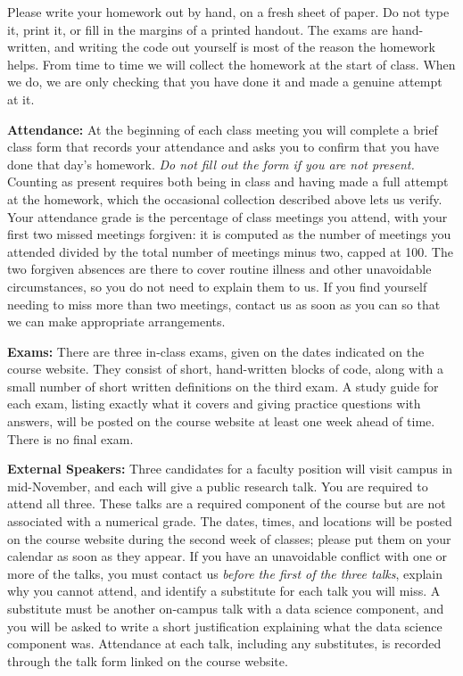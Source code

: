 \documentclass[11pt, a4paper]{article}
\begin{document}
\medskip

Please write your homework out by hand, on a fresh sheet of paper. Do not type it, print it, or fill in the margins of a printed handout. The exams are hand-written, and writing the code out yourself is most of the reason the homework helps. From time to time we will collect the homework at the start of class. When we do, we are only checking that you have done it and made a genuine attempt at it. 

\bigskip

\textbf{Attendance:}
At the beginning of each class meeting you will complete a brief class form that records your attendance and asks you to confirm that you have done that day's homework. \textit{Do not fill out the form if you are not present.} Counting as present requires both being in class and having made a full attempt at the homework, which the occasional collection described above lets us verify. Your attendance grade is the percentage of class meetings you attend, with your first two missed meetings forgiven: it is computed as the number of meetings you attended divided by the total number of meetings minus two, capped at 100. The two forgiven absences are there to cover routine illness and other unavoidable circumstances, so you do not need to explain them to us. If you find yourself needing to miss more than two meetings, contact us as soon as you can so that we can make appropriate arrangements.

\bigskip

\textbf{Exams:}
There are three in-class exams, given on the dates indicated on the course website. They consist of short, hand-written blocks of code, along with a small number of short written definitions on the third exam. A study guide for each exam, listing exactly what it covers and giving practice questions with answers, will be posted on the course website at least one week ahead of time. There is no final exam.

\bigskip

\textbf{External Speakers:}
Three candidates for a faculty position will visit campus in mid-November, and each will give a public research talk. You are required to attend all three. These talks are a required component of the course but are not associated with a numerical grade. The dates, times, and locations will be posted on the course website during the second week of classes; please put them on your calendar as soon as they appear. If you have an unavoidable conflict with one or more of the talks, you must contact us \textit{before the first of the three talks}, explain why you cannot attend, and identify a substitute for each talk you will miss. A substitute must be another on-campus talk with a data science component, and you will be asked to write a short justification explaining what the data science component was. Attendance at each talk, including any substitutes, is recorded through the talk form linked on the course website.
\end{document}
